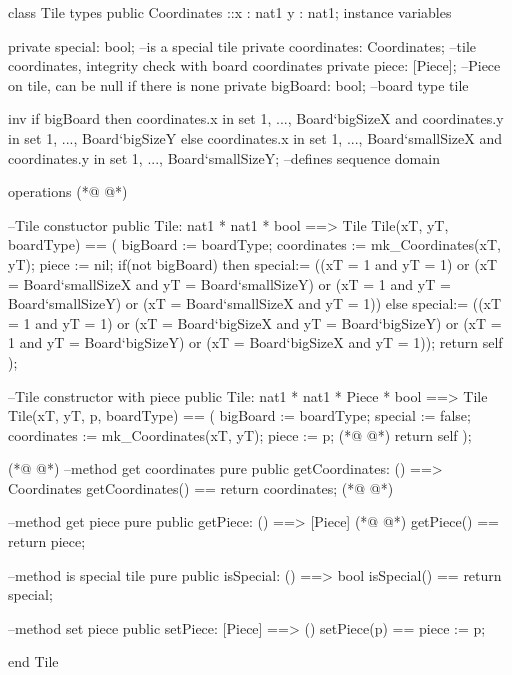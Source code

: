 \begin{vdmpp}[breaklines=true]
class Tile
types
  public Coordinates ::x : nat1
             y : nat1;
instance variables

  private special: bool; --is a special tile
  private coordinates: Coordinates; --tile coordinates, integrity check with board coordinates
  private piece: [Piece]; --Piece on tile, can be null if there is none
  private bigBoard: bool; --board type tile
  
  inv if bigBoard then coordinates.x in set {1, ..., Board`bigSizeX} and
    coordinates.y in set {1, ..., Board`bigSizeY}
    else coordinates.x in set {1, ..., Board`smallSizeX} and
    coordinates.y in set {1, ..., Board`smallSizeY}; --defines sequence domain
  
operations
(*@
\label{Tile:18}
@*)

  --Tile constuctor
  public Tile: nat1 * nat1 * bool ==> Tile
  Tile(xT, yT, boardType) == (
    bigBoard := boardType;
    coordinates := mk_Coordinates(xT, yT);
    piece := nil;
    if(not bigBoard) then
     special:= ((xT = 1 and yT = 1) or (xT = Board`smallSizeX and yT = Board`smallSizeY) or
      (xT = 1 and yT = Board`smallSizeY) or (xT = Board`smallSizeX and yT = 1))
    else special:= ((xT = 1 and yT = 1) or (xT = Board`bigSizeX and yT = Board`bigSizeY) or
      (xT = 1 and yT = Board`bigSizeY) or (xT = Board`bigSizeX and yT = 1));
    return self
  );
  
  --Tile constructor with piece
  public Tile: nat1 * nat1 * Piece * bool ==> Tile
    Tile(xT, yT, p, boardType) == (
    bigBoard := boardType;
    special := false;
    coordinates := mk_Coordinates(xT, yT);
    piece := p;
(*@
\label{getCoordinates:40}
@*)
    return self
  );
  
(*@
\label{getPiece:43}
@*)
  --method get coordinates
  pure public getCoordinates: () ==> Coordinates
  getCoordinates() == return coordinates;
(*@
\label{isSpecial:46}
@*)
  
  --method get piece
  pure public getPiece: () ==> [Piece]
(*@
\label{setPiece:49}
@*)
  getPiece() == return piece;
  
  --method is special tile
  pure public isSpecial: () ==> bool
  isSpecial() == return special;
  
  --method set piece
  public setPiece: [Piece] ==> ()
  setPiece(p) == piece := p;
  
end Tile
\end{vdmpp}
